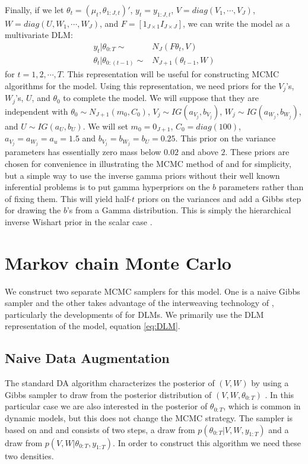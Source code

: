 \documentclass[graybox]{svmult}
\begin{document}
Finally, if we let $\theta_t=(\mu_t,\theta_{1:J,t})'$, $y_t=y_{1:J,t}$, $V=diag(V_1,\cdots,V_J)$, $W=diag(U,W_1,\cdots,W_J)$, and $F=[1_{J\times 1} I_{J\times J}]$, we can write the model as a multivariate DLM:
\begin{align}
y_t|\theta_{0:T}\sim&N_J(F\theta_t,V)\nonumber\\
\theta_t|\theta_{0:(t-1)}\sim&N_{J+1}(\theta_{t-1},W)\label{eq:DLM}
\end{align}
for $t=1,2,\cdots,T$. This representation will be useful for constructing MCMC algorithms for the model. Using this representation, we need priors for the $V_j$'s, $W_j$'s, $U$, and $\theta_0$ to complete the model. We will suppose that they are independent with $\theta_0\sim N_{J+1}(m_0,C_0)$, $V_j\sim IG(a_{V_j},b_{V_j})$, $W_j\sim IG(a_{W_j},b_{W_j})$, and $U\sim IG(a_U,b_U)$. We will set $m_0=0_{J+1}$, $C_0=diag(100)$, $a_{V_j}=a_{W_j}=a_u=1.5$ and $b_{V_j}=b_{W_j}=b_U=0.25$. This prior on the variance parameters has essentially zero mass below $0.02$ and above $2$. These priors are chosen for convenience in illustrating the MCMC method of \citet{simpson2014interweaving} and for simplicity, but a simple way to use the inverse gamma priors without their well known inferential problems \citep{gelman2006prior} is to put gamma hyperpriors on the $b$ parameters rather than of fixing them. This will yield half-$t$ priors on the variances and add a Gibbs step for drawing the $b$'s from a Gamma distribution. This is simply the hierarchical inverse Wishart prior in the scalar case \citep{huang2013simple}.


\section{Markov chain Monte Carlo}\label{sec:MCMC}
We construct two separate MCMC samplers for this model. One is a naive Gibbs sampler and the other takes advantage of the interweaving technology of \citet{yu2011center}, particularly the developments of \citet{simpson2014interweaving} for DLMs. We primarily use the DLM representation of the model, equation \ref{eq:DLM}. 

\subsection{Naive Data Augmentation}\label{sec:gibbs}

The standard DA algorithm characterizes the posterior of $(V,W)$ by using a Gibbs sampler to draw from the posterior distribution of $(V,W,\theta_{0:T})$ \citep{tanner1987calculation}. In this particular case we are also interested in the posterior of $\theta_{0:T}$, which is common in dynamic models, but this does not change the MCMC strategy. The sampler is based on \citet{fruhwirth1994data} and \citet{carter1994gibbs} and consists of two steps, a draw from $p(\theta_{0:T}|V,W,y_{1:T})$ and a draw from $p(V,W|\theta_{0:T},y_{1:T})$. In order to construct this algorithm we need these two densities.
\end{document}
